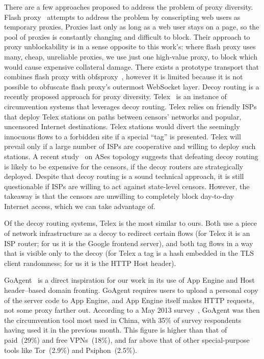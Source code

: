 \documentclass{article}
\begin{document}
There are a few approaches proposed to address the problem of proxy diversity.
Flash proxy~\cite{flashproxy-pets12} attempts to address the problem  by
conscripting web users as temporary proxies. Proxies last only as long as a web
user stays on a page, so the pool of proxies is constantly changing and
difficult to block. Their approach to proxy unblockability is in a sense
opposite to this work's: where flash proxy uses many, cheap, unreliable proxies,
we use just one high-value proxy, to block which would cause expensive
collateral damage. There exists a prototype transport that combines flash proxy
with obfsproxy~\cite{obfs-flash}, however it is limited because it is not
possible to obfuscate flash proxy's outermost WebSocket layer. Decoy routing is
a recently proposed approach for proxy diversity. Telex~\cite{telex} is an
instance of circumvention systems that leverages decoy routing. Telex relies on
friendly ISPs that deploy Telex stations on paths between censors' networks and
popular, uncensored Internet destinations. Telex stations would divert the
seemingly  innocuous flows to a forbidden site if a special ``tag'' is
presented. Telex will prevail only if a large number of ISPs are cooperative and
willing to deploy such stations. A recent study~\cite{nodirectionhome} on ASes
topology suggests that defeating decoy routing is likely to be expensive for the
censors, if the decoy routers are strategically deployed. Despite that decoy
routing is a sound technical approach, it is still questionable if ISPs are
willing to act against state-level censors. However, the takeaway is that the
censors are unwilling to completely block day-to-day Internet access, which we
can take advantage of.

Of the decoy routing systems, Telex is the most similar to ours.
Both use a piece of network infrastructure as a decoy to redirect certain flows
(for Telex it is an ISP router; for us it is the Google frontend server),
and both tag flows in a way that is visible only to the decoy
(for Telex a tag is a hash embedded in the TLS client randomness; for us it is the HTTP Host header).

GoAgent~\cite{goagent} is a direct inspiration for our work in its use of App
Engine and Host header--based domain fronting. GoAgent requires users to upload
a personal copy of the server code to App Engine, and App Engine itself makes
HTTP requests, not some proxy farther out. According to a May 2013 survey~\cite{collateral-freedom},
GoAgent was then the circumvention tool most used in
China, with 35\% of survey respondents having used it in the previous month.
This figure is higher than that of paid~(29\%) and free VPNs~(18\%), and far
above that of other special-purpose tools like Tor~(2.9\%) and Psiphon~(2.5\%).
\end{document}

